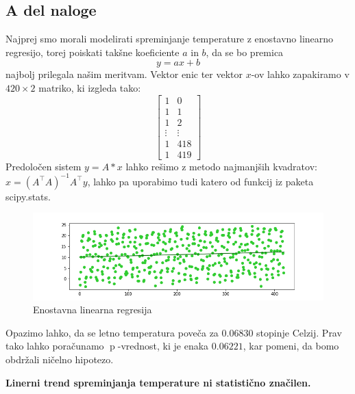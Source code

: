 \documentclass{article}
\DeclareMathOperator{\pval}{p}
\begin{document}
    \subsection{A del naloge}
    Najprej smo morali modelirati spreminjanje temperature z enostavno linearno regresijo, torej poiskati takšne koeficiente $a$ in $b$, da se bo premica
    \[
        y = ax + b  
    \]
    najbolj prilegala našim meritvam. Vektor enic ter vektor $x$-ov lahko zapakiramo v $420\times2$ matriko, ki izgleda tako:
    \[
        \begin{bmatrix}
            1 & 0 \\
            1 & 1 \\
            1 & 2 \\
            \vdots & \vdots \\
            1 & 418 \\
            1 & 419
        \end{bmatrix}  
    \]
    Predoločen sistem $y = A*x$ lahko rešimo z metodo najmanjših kvadratov: $x = (A^\intercal A)^{-1}A^\intercal y$, lahko pa uporabimo tudi katero od funkcij iz paketa scipy.stats.
    \begin{figure}[H]
        \begin{center}
            \includegraphics[scale=0.5]{../PythonKoda/EnLinReg.png}
            \caption{Enostavna linearna regresija}
            \label{ELR}
        \end{center} 
    \end{figure}
    Opazimo lahko, da se letno temperatura poveča za $0.06830$ stopinje Celzij. Prav tako lahko poračunamo $\pval$-vrednost, ki je enaka $0.06221$, kar pomeni, da bomo
    obdržali ničelno hipotezo.
    \par \textbf{Linerni trend spreminjanja temperature ni statistično značilen.}
\end{document}
